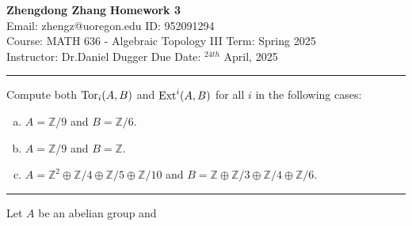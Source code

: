 \documentclass[a4paper, 12pt]{article}
\begin{document}
\noindent
\large\textbf{Zhengdong Zhang} \hfill \textbf{Homework 3}   \\
Email: zhengz@uoregon.edu \hfill ID: 952091294 \\
\normalsize Course: MATH 636 - Algebraic Topology III \hfill Term: Spring 2025\\
Instructor: Dr.Daniel Dugger \hfill Due Date: $^{24th}$ April, 2025 \\
\noindent\rule{7in}{2.8pt}

\begin{problem}{1}
Compute both \(\text{Tor}_i(A,B)\) and \(\text{Ext}^i(A,B)\) for all \(i\) in the following cases: 
\begin{enumerate}[(a)]
\item \(A=\mathbb{Z}/9\) and \(B=\mathbb{Z}/6\).
\item \(A=\mathbb{Z}/9\) and \(B=\mathbb{Z}\).
\item \(A=\mathbb{Z}^2\oplus \mathbb{Z}/4\oplus \mathbb{Z}/5\oplus \mathbb{Z}/10\) and \(B=\mathbb{Z}\oplus \mathbb{Z}/3\oplus \mathbb{Z}/4\oplus \mathbb{Z}/6\).
\end{enumerate}
\end{problem}
\begin{solution}

\end{solution}

\noindent\rule{7in}{2.8pt}
\begin{problem}{1}
Let \(A\) be an abelian group and 
\end{problem}
\end{document}
